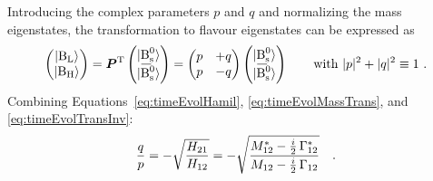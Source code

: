 Introducing the complex parameters $p$ and $q$ and normalizing the mass eigenstates, the transformation to flavour eigenstates can be
expressed as
\begin{equation}
  \label{eq:timeEvolTransInv}
  \begin{pmatrix} \BLst \\ \BHst \end{pmatrix}
    = \vec{P}^\text{T} \begin{pmatrix} \Bsst \\ \Bsbarst \end{pmatrix}
    = \begin{pmatrix} p & +q \\ p & -q \end{pmatrix}
      \begin{pmatrix} \Bsst \\ \Bsbarst \end{pmatrix}
  \qquad
  \text{with } |p|^2+|q|^2\equiv1
  \ .
\end{equation}
Combining Equations~\ref{eq:timeEvolHamil}, \ref{eq:timeEvolMassTrans}, and \ref{eq:timeEvolTransInv}:
\begin{equation}
  \label{eq:qpDef}
  \frac{q}{p} = -\sqrt{\frac{H_{21}}{H_{12}}} = -\sqrt{\frac{M_\text{12}^*-\tfrac{i}{2}\,\Gamma_\text{12}^*}{M_\text{12}-\tfrac{i}{2}\,\Gamma_\text{12}}}
  \quad .
\end{equation}

